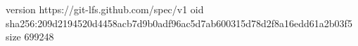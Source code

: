version https://git-lfs.github.com/spec/v1
oid sha256:209d2194520d4458acb7d9b0adf96ac5d7ab600315d78d2f8a16edd61a2b03f5
size 699248
